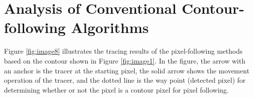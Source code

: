 
\section{Analysis of Conventional Contour-following Algorithms}


Figure \ref{fig:image8} illustrates the tracing results of the pixel-following methods based on the contour shown in Figure \ref{fig:image1}. In the figure, the arrow with an anchor is the tracer at the starting pixel, the solid arrow shows the movement operation of the tracer, and the dotted line is the way point (detected pixel) for determining whether or not the pixel is a contour pixel for pixel following.

